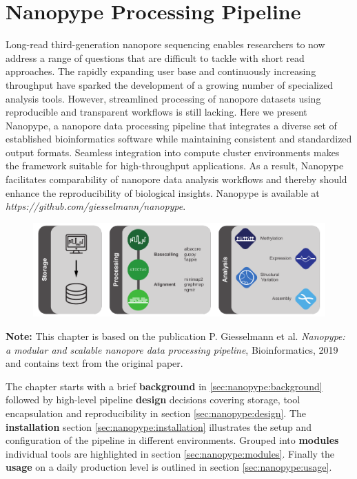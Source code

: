 \chapter{Nanopype Processing Pipeline}
\label{sec:nanopype}

Long-read third-generation nanopore sequencing enables researchers to now address a range of questions that are difficult to tackle with short read approaches. The rapidly expanding user base and continuously increasing throughput have sparked the development of a growing number of specialized analysis tools. However, streamlined processing of nanopore datasets using reproducible and transparent workflows is still lacking. Here we present Nanopype, a nanopore data processing pipeline that integrates a diverse set of established bioinformatics software while maintaining consistent and standardized output formats. Seamless integration into compute cluster environments makes the framework suitable for high-throughput applications. As a result, Nanopype facilitates comparability of nanopore data analysis workflows and thereby should enhance the reproducibility of biological insights. Nanopype is available at \textit{https://github.com/giesselmann/nanopype}.

\begin{figure}[h]
    \centering
    \includegraphics[width=1.0\textwidth]{figures/nanopype/GA.pdf}
    \label{fig:nanopype:ga}
\end{figure}

\textbf{Note:} This chapter is based on the publication P. Giesselmann et al. \textit{Nanopype: a modular and scalable nanopore data processing pipeline}, Bioinformatics, 2019 and contains text from the original paper.

The chapter starts with a brief \textbf{background} in \ref{sec:nanopype:background} followed by high-level pipeline \textbf{design} decisions covering storage, tool encapsulation and reproducibility in section \ref{sec:nanopype:design}.
The \textbf{installation} section \ref{sec:nanopype:installation} illustrates the setup and configuration of the pipeline in different environments. Grouped into \textbf{modules} individual tools are highlighted in section \ref{sec:nanopype:modules}.
Finally the \textbf{usage} on a daily production level is outlined in section \ref{sec:nanopype:usage}.




